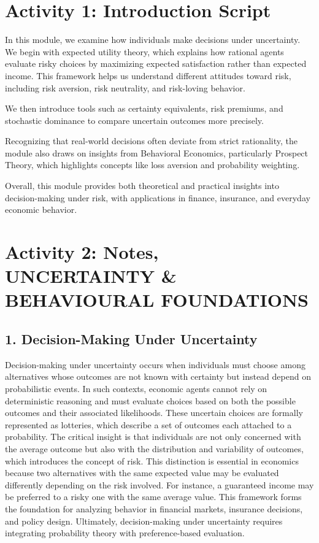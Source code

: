 \documentclass[12pt,a4paper]{article}
\begin{document}
\section*{Activity 1: Introduction Script}
In this module, we examine how individuals make decisions under uncertainty. We begin with expected utility theory, which explains how rational agents evaluate risky choices by maximizing expected satisfaction rather than expected income. This framework helps us understand different attitudes toward risk, including risk aversion, risk neutrality, and risk-loving behavior.

We then introduce tools such as certainty equivalents, risk premiums, and stochastic dominance to compare uncertain outcomes more precisely.

Recognizing that real-world decisions often deviate from strict rationality, the module also draws on insights from Behavioral Economics, particularly Prospect Theory, which highlights concepts like loss aversion and probability weighting.

Overall, this module provides both theoretical and practical insights into decision-making under risk, with applications in finance, insurance, and everyday economic behavior.

\section*{Activity 2: Notes, UNCERTAINTY \& BEHAVIOURAL FOUNDATIONS}

\subsection*{1. Decision-Making Under Uncertainty}
Decision-making under uncertainty occurs when individuals must choose among alternatives whose outcomes are not known with certainty but instead depend on probabilistic events. In such contexts, economic agents cannot rely on deterministic reasoning and must evaluate choices based on both the possible outcomes and their associated likelihoods. These uncertain choices are formally represented as lotteries, which describe a set of outcomes each attached to a probability. The critical insight is that individuals are not only concerned with the average outcome but also with the distribution and variability of outcomes, which introduces the concept of risk. This distinction is essential in economics because two alternatives with the same expected value may be evaluated differently depending on the risk involved. For instance, a guaranteed income may be preferred to a risky one with the same average value. This framework forms the foundation for analyzing behavior in financial markets, insurance decisions, and policy design. Ultimately, decision-making under uncertainty requires integrating probability theory with preference-based evaluation.
\end{document}
